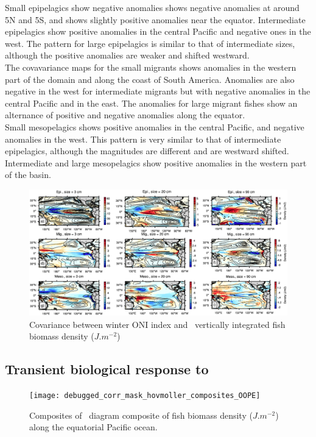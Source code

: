 Small epipelagics show negative anomalies shows negative anomalies at around 5N and 5S, and shows slightly positive anomalies 
near the equator. Intermediate epipelagics show positive anomalies in the central Pacific and negative ones in the west.
The pattern for large epipelagics is similar to that of intermediate sizes, although the positive anomalies are weaker and shifted westward.\\

The covavariance maps for the small migrants shows anomalies in the western part of the domain and along the coast of South America. Anomalies are also negative in the west for intermediate migrants but with negative anomalies in the central Pacific and in the east. The anomalies for large migrant fishes show an alternance of positive and negative anomalies along the equator. \\

Small mesopelagics shows positive anomalies in the central Pacific, and negative anomalies in the west.  
This pattern is very similar to that of intermediate epipelagics, although the magnitudes are different and are westward shifted. Intermediate and large mesopelagics show positive anomalies in the western part of the basin. \\ 


\begin{figure}[h!]
    \centering
    \includegraphics[width=\textwidth] {figs/debugged_corr_mask_covariance_maps_OOPE.pdf}
    \caption{Covariance between winter ONI index and \ap\ vertically integrated fish biomass density ($J.m^{-2}$)	}
    \label{fig:cov-ape}
\end{figure}

\subsection{Transient biological response to \nino}

\begin{figure}[h!]
    \centering
    \texttt{[image: debugged\_corr\_mask\_hovmoller\_composites\_OOPE]}
    \caption{Composites of \hov\ diagram composite of fish biomass density ($J.m^{-2}$) along the equatorial Pacific ocean.}
    \label{fig:hov-oope}
\end{figure}

\clearpage
